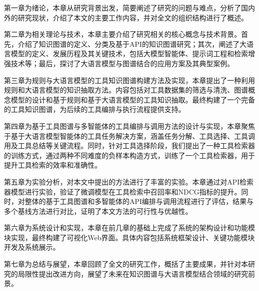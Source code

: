   \indent 第一章为绪论，本章从研究背景出发，简要阐述了研究的问题与难点，分析了国内外的研究现状，介绍了本文的主要工作内容，并对全文的组织结构进行了概述。

  \indent 第二章为相关理论与技术，本章主要介绍了研究相关的核心概念与技术背景。首先，介绍了知识图谱的定义、分类及基于API的知识图谱研究；其次，阐述了大语言模型的定义、发展历程及其关键技术，包括大模型智能体、提示词工程和检索增强技术等；最后，探讨了大语言模型与图谱结合的应用方案及其典型案例。
  
  \indent 第三章为规则与大语言模型的工具知识图谱构建方法及实现，本章提出了一种利用规则和大语言模型的知识抽取方法。内容包括对工具数据集的筛选与清洗、图谱概念模型的设计和基于规则和基于大语言模型的工具知识抽取。最终构建了一个完备的工具知识图谱，为后续的工具编排与执行流程提供支持。
  
  \indent 第四章为基于工具图谱与多智能体的工具编排与调用方法的设计与实现，本章聚焦于基于大语言模型智能体的工具任务解决方案，涵盖任务分解、工具选择、工具调用及工具总结等关键流程。同时，针对工具选择阶段，我们提出了一种工具检索器的训练方式，通过两种不同难度的负样本构造方式，训练了一个工具检索器，用于提升工具检索的效率和准确性。
  
  \indent 第五章为实验分析，对本文中提出的方法进行了丰富的实验。本章通过对API检索器模型进行实验，验证了微调模型在工具检索中召回率和NDCG指标的提升。同时，对整体的基于工具图谱和多智能体的API编排与调用流程进行了评估，结果与多个基线方法进行对比，证明了本文方法的可行性与优越性。
  
  \indent 第六章为系统设计和实现，本章在前几章的基础上完成了系统的架构设计和功能模块实现，最终构建了可视化Web界面。具体内容包括系统框架设计、关键功能模块开发及系统展示。
  
  \indent 第七章为总结与展望，本章回顾了全文的研究工作，概括了主要成果，并针对本研究的局限性提出改进方向，展望了未来在知识图谱与大语言模型结合领域的研究前景。